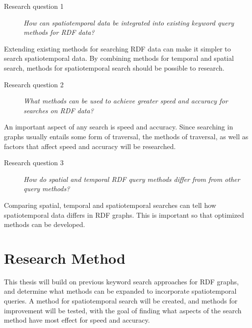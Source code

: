\begin{description}
    \item[Research question 1] {\em How can spatiotemporal data be integrated into existing keyword query methods for RDF data?}
\end{description}
Extending existing methods for searching RDF data can make it simpler to search spatiotemporal data. By combining methods for temporal and spatial search, methods for spatiotemporal search should be possible to research.

\begin{description}
    \item[Research question 2] {\em What methods can be used to achieve greater speed and accuracy for searches on RDF data?}
\end{description}
An important aspect of any search is speed and accuracy. Since searching in graphs usually entails some form of traversal, the methods of traversal, as well as factors that affect speed and accuracy will be researched.

\begin{description}
    \item[Research question 3] {\em How do spatial and temporal RDF query methods differ from from other query methods?}
\end{description}
Comparing spatial, temporal and spatiotemporal searches can tell how spatiotemporal data differs in RDF graphs. This is important so that optimized methods can be developed.

\section{Research Method}
\label{sec:researchMethod}
This thesis will build on previous keyword search approaches for RDF graphs, and determine what methods can be expanded to incorporate spatiotemporal queries. A method for spatiotemporal search will be created, and methods for improvement will be tested, with the goal of finding what aspects of the search method have most effect for speed and accuracy.

\glsresetall